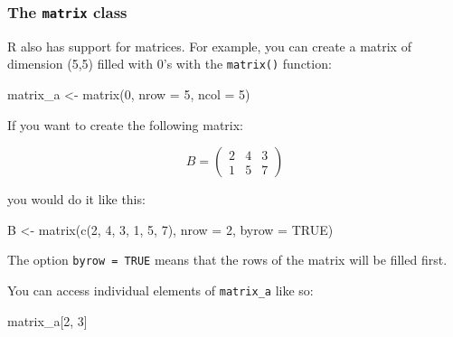 \documentclass[
]{article}
\newenvironment{Shaded}{\begin{snugshade}}{\end{snugshade}}
\newcommand{\AttributeTok}[1]{\textcolor[rgb]{0.77,0.63,0.00}{#1}}
\newcommand{\ConstantTok}[1]{\textcolor[rgb]{0.00,0.00,0.00}{#1}}
\newcommand{\DecValTok}[1]{\textcolor[rgb]{0.00,0.00,0.81}{#1}}
\newcommand{\FunctionTok}[1]{\textcolor[rgb]{0.00,0.00,0.00}{#1}}
\newcommand{\NormalTok}[1]{#1}
\newcommand{\OtherTok}[1]{\textcolor[rgb]{0.56,0.35,0.01}{#1}}
\begin{document}
\hypertarget{the-matrix-class}{%
\subsubsection{\texorpdfstring{The \texttt{matrix} class}{The matrix class}}\label{the-matrix-class}}

R also has support for matrices. For example, you can create a matrix of dimension (5,5) filled
with 0's with the \texttt{matrix()} function:

\begin{Shaded}
\begin{Highlighting}[]
\NormalTok{matrix\_a }\OtherTok{\textless{}{-}} \FunctionTok{matrix}\NormalTok{(}\DecValTok{0}\NormalTok{, }\AttributeTok{nrow =} \DecValTok{5}\NormalTok{, }\AttributeTok{ncol =} \DecValTok{5}\NormalTok{)}
\end{Highlighting}
\end{Shaded}

If you want to create the following matrix:

\[
B = \left(
\begin{array}{ccc}
 2 & 4 & 3 \\
 1 & 5 & 7
\end{array} \right)
\]

you would do it like this:

\begin{Shaded}
\begin{Highlighting}[]
\NormalTok{B }\OtherTok{\textless{}{-}} \FunctionTok{matrix}\NormalTok{(}\FunctionTok{c}\NormalTok{(}\DecValTok{2}\NormalTok{, }\DecValTok{4}\NormalTok{, }\DecValTok{3}\NormalTok{, }\DecValTok{1}\NormalTok{, }\DecValTok{5}\NormalTok{, }\DecValTok{7}\NormalTok{), }\AttributeTok{nrow =} \DecValTok{2}\NormalTok{, }\AttributeTok{byrow =} \ConstantTok{TRUE}\NormalTok{)}
\end{Highlighting}
\end{Shaded}

The option \texttt{byrow\ =\ TRUE} means that the rows of the matrix will be filled first.

You can access individual elements of \texttt{matrix\_a} like so:

\begin{Shaded}
\begin{Highlighting}[]
\NormalTok{matrix\_a[}\DecValTok{2}\NormalTok{, }\DecValTok{3}\NormalTok{]}
\end{Highlighting}
\end{Shaded}
\end{document}
